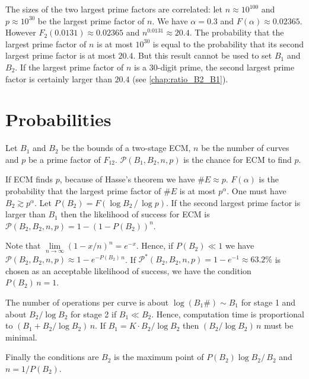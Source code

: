 \documentclass[a4paper, 11pt, pdftex]{report}
\theoremstyle{plain}
\theoremstyle{definition}
\begin{document}
The sizes of the two largest prime factors are correlated: let $n \approx 10^{100}$
and $p \approx 10^{30}$ be the largest prime factor of $n$. We have $\alpha = 0.3$
and $F(\alpha) \approx 0.02365$. However $F_2(0.0131) \approx 0.02365$ and
$n^{0.0131} \approx 20.4$.
The probability that the largest prime factor of $n$ is at most $10^{30}$ is equal to
the probability that its second largest prime factor is at most $20.4$. But this result
cannot be used to set $B_1$ and $B_2$. If the largest prime factor of $n$ is a 30-digit
prime, the second largest prime factor is certainly larger than $20.4$
(see \autoref{chap:ratio_B2_B1}).

\section{Probabilities}

Let $B_1$ and $B_2$ be the bounds of a two-stage ECM, $n$ be the number of curves and $p$
be a prime factor of $F_{12}$. $\mathcal{P}(B_1, B_2, n, p)$ is the chance for ECM to
find $p$.

If ECM finds $p$, because of Hasse's theorem we have $\#E \approx p$. $F(\alpha)$ is the probability that
the largest prime factor of $\#E$ is at most $p^\alpha$. One must have $B_2 \gtrsim p^\alpha$.
Let $P(B_2) = F(\log B_2\, /\, \log p)$. If the second largest prime factor is larger than $B_1$
then the likelihood of success for ECM is
$\mathcal{P}(B_2, B_2, n, p) = 1 - \left(1 - P(B_2) \right)^n$.

Note that $\lim\limits_{n \to \infty} \left(1 - x/n \right)^n = e^{-x}$. Hence, if
$P(B_2) \ll 1$ we have $\mathcal{P}(B_2, B_2, n, p) \approx 1 - e^{-P(B_2)\, n}$.
If $\mathcal{P}^*(B_2, B_2, n, p) = 1 - e^{-1} \approx 63.2\%$ is chosen as an acceptable
likelihood of success, we have the condition $P(B_2)\, n = 1.$

The number of operations per curve is about $\log(B_1\#) \sim B_1$ for stage 1 and about
$B_2 / \log B_2$ for stage 2 if $B_1 \ll B_2$. Hence, computation time is proportional to
$\left(B_1 + B_2 / \log B_2 \right)\, n$. If $B_1 = K \cdot B_2 / \log B_2$ then
$\left(B_2 / \log B_2 \right)\, n$ must be minimal.

Finally the conditions are $B_2$ is the maximum point of $P(B_2) \log B_2 /\, B_2$
and $n = 1 / P(B_2)$.
\end{document}
